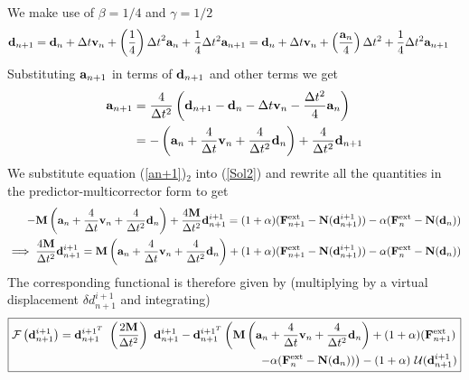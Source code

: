 We make use of $\beta = 1/4$ and $\gamma = 1/2$
\begin{align*}
{\bf d}_{n+1}
& =
{\bf d}_n + \Delta t {\bf v}_n + \left(\frac{1}{4}\right){\Delta t}^2 {\bf a}_n + \frac{1}{4}\Delta t^2 {\bf a}_{n+1} =  {\bf d}_n + \Delta t {\bf v}_n + \left( \frac{{\bf a}_n}{4}\right)\Delta t^2 + \frac{1}{4}\Delta t^2 {\bf a}_{n+1} 
\end{align*}
Substituting ${\bf a}_{n+1}$ in terms of ${\bf d}_{n+1}$ and other terms we get
\begin{align}
\begin{split}
{\bf a}_{n+1}
& =
\frac{4}{\Delta t^2}
\left({\bf d}_{n+1} - {\bf d}_{n} - \Delta t {\bf v}_n - \frac{\Delta t^2}{4}{\bf a}_n 
\right) \\
& =
-\left(
{\bf a}_n + \frac{4}{\Delta t}{\bf v}_n + \frac{4}{\Delta t^2}{\bf d}_n
\right) + \frac{4}{\Delta t^2} {\bf d}_{n+1}
\end{split}
\label{an+1}
\end{align}
We substitute equation (\ref{an+1})$_2$ into (\ref{Sol2}) and rewrite all the quantities in the predictor-multicorrector form to get
\begin{align*}
-{\bf M}\left(
{\bf a}_n + \frac{4}{\Delta t}{\bf v}_n + \frac{4}{\Delta t^2}{\bf d}_n
\right) 
+
\frac{4{\bf M}}{\Delta t^2}{\bf d}^{i+1}_{n+1}
= 
(1+\alpha)({\bf F}^{\rm ext}_{n+1} - {\bf N}({\bf d}^{i+1}_{n+1})) - \alpha ({\bf F}^{\rm ext}_n - {\bf N}({\bf d}_n)) \\
\implies 
\frac{4{\bf M}}{\Delta t^2}{\bf d}^{i+1}_{n+1}
=
{\bf M}\left(
{\bf a}_n + \frac{4}{\Delta t}{\bf v}_n + \frac{4}{\Delta t^2}{\bf d}_n
\right) 
+
(1+\alpha)({\bf F}^{\rm ext}_{n+1} - {\bf N}({\bf d}^{i+1}_{n+1})) - \alpha ({\bf F}^{\rm ext}_n - {\bf N}({\bf d}_n)) 
\end{align*}
The corresponding functional is therefore given by (multiplying by a virtual displacement $\delta d^{i+1}_{n+1}$ and integrating) 
\begin{align*}
\boxed{
\begin{aligned}
\mathcal{F} \left({\bf d}^{i+1}_{n+1}\right)
= {\bf d}^{{i+1}^T}_{n+1}\ 
\left(\frac{2{\bf M}}{\Delta t^2}\right)\  
{\bf d}^{i+1}_{n+1}
- 
{\bf d}^{{i+1}^T}_{n+1}
\left(
{\bf M}\left(
{\bf a}_n + \frac{4}{\Delta t}{\bf v}_n + \frac{4}{\Delta t^2}{\bf d}_n
\right) 
+
(1+\alpha)({\bf F}^{\rm ext}_{n+1}) \right. \\
\left. - \alpha ({\bf F}^{\rm ext}_n - {\bf N}({\bf d}_n))\right)
 - (1+\alpha)\ {\mathcal{U}}({\bf d}^{i+1}_{n+1})
\end{aligned}
}
\end{align*}
